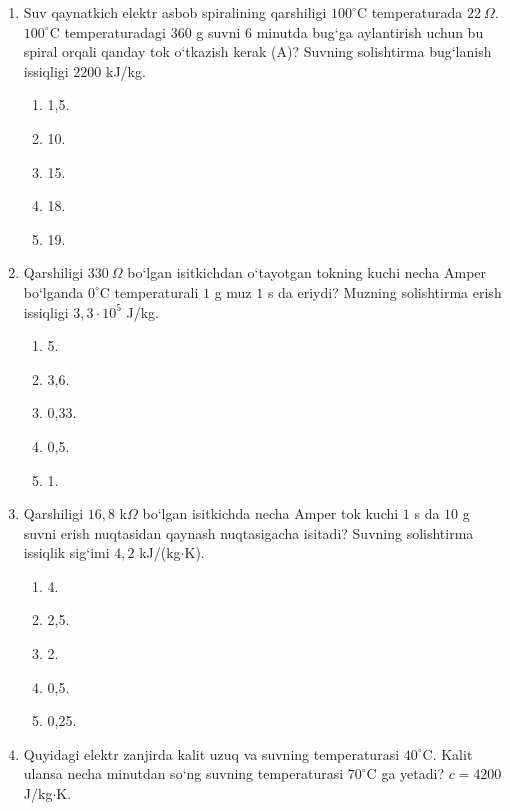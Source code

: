 \begin{enumerate}
\item Suv qaynatkich elektr asbob spiralining qarshiligi $100^\circ$C temperaturada $22~\Omega$. $100^\circ$C temperaturadagi $360$ g suvni $6$ minutda bug‘ga aylantirish uchun bu spiral orqali qanday tok o‘tkazish kerak (A)? Suvning solishtirma bug‘lanish issiqligi $2200$ kJ/kg.
\begin{enumerate}[label=\Alph*)]
\item 1,5.
\item 10.
\item 15.
\item 18.
\item 19.
\end{enumerate}

\item Qarshiligi $330~\Omega$ bo‘lgan isitkichdan o‘tayotgan tokning kuchi necha Amper bo‘lganda $0^\circ$C temperaturali $1$ g muz $1$ s da eriydi? Muzning solishtirma erish issiqligi $3,3\cdot10^5$ J/kg.
\begin{enumerate}[label=\Alph*)]
\item 5.
\item 3,6.
\item 0,33.
\item 0,5.
\item 1.
\end{enumerate}

\item Qarshiligi $16,8$ k$\Omega$ bo‘lgan isitkichda necha Amper tok kuchi $1$ s da $10$ g suvni erish nuqtasidan qaynash nuqtasigacha isitadi? Suvning solishtirma issiqlik sig‘imi $4,2$ kJ/(kg$\cdot$K).
\begin{enumerate}[label=\Alph*)]
\item 4.
\item 2,5.
\item 2.
\item 0,5.
\item 0,25.
\end{enumerate}

\item Quyidagi elektr zanjirda kalit uzuq va suvning temperaturasi $40^\circ$C. Kalit ulansa necha minutdan so‘ng suvning temperaturasi $70^\circ$C ga yetadi? $c=4200$ J/kg$\cdot$K.

\end{enumerate}
